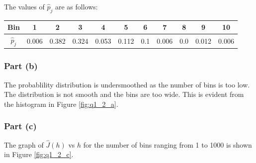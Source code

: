 The values of $\hat{p}_j$ are as follows:

\begin{tabular}
    { |c|c|c|c|c|c|c|c|c|c|c| }
    \hline
    Bin & 1 & 2 & 3 & 4 & 5 & 6 & 7 & 8 & 9 & 10 \\
    \hline
    $\hat{p}_j$ & 0.006 & 0.382 & 0.324 & 0.053 & 0.112 & 0.1 & 0.006 & 0.0 & 0.012 & 0.006 \\
    \hline
\end{tabular}

\subsubsection{Part (b)}

The probablility distribution is undersmoothed as the number of bins is too low. The distribution is not smooth and the bins are too wide. This is evident from the histogram in Figure \ref{fig:q1_2_a}.

\subsubsection{Part (c)}

The graph of $\hat{J}(h)$ vs $h$ for the number of bins ranging from 1 to 1000 is shown in Figure \ref{fig:q1_2_c}.


